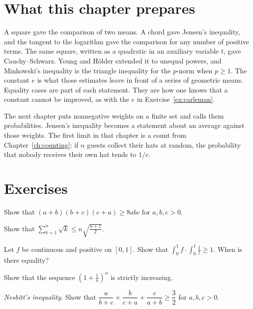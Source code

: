\section*{What this chapter prepares}

A square gave the comparison of two means. A chord gave Jensen's inequality, and the tangent to the logarithm gave the comparison for any number of positive terms. The same square, written as a quadratic in an auxiliary variable $t$, gave Cauchy--Schwarz. Young and H\"older extended it to unequal powers, and Minkowski's inequality is the triangle inequality for the $p$-norm when $p\ge1$. The constant $e$ is what those estimates leave in front of a series of geometric means. Equality cases are part of each statement. They are how one knows that a constant cannot be improved, as with the $e$ in Exercise~\ref{ex:carleman}.

The next chapter puts nonnegative weights on a finite set and calls them probabilities. Jensen's inequality becomes a statement about an average against those weights. The first limit in that chapter is a count from Chapter~\ref{ch:counting}: if $n$ guests collect their hats at random, the probability that nobody receives their own hat tends to $1/e$.

\section{Exercises}

\begin{exercise}[$\star$]\label{ex:8abc}
Show that $(a+b)(b+c)(c+a)\ge8abc$ for $a,b,c>0$.
\end{exercise}

\begin{exercise}[$\star$]\label{ex:sqrtk}
Show that $\displaystyle\sum_{k=1}^n\sqrt k\le n\sqrt{\frac{n+1}2}$.
\end{exercise}

\begin{exercise}[$\star$]\label{ex:intcs}
Let $f$ be continuous and positive on $[0,1]$. Show that $\displaystyle\int_0^1f\cdot\int_0^1\frac1f\ge1$. When is there equality?
\end{exercise}

\begin{exercise}[$\star\star$]\label{ex:euler}
Show that the sequence $\left(1+\frac1n\right)^n$ is strictly increasing.
\end{exercise}

\begin{exercise}[$\star\star$]\label{ex:nesbitt}
\emph{Nesbitt's inequality.} Show that $\dfrac a{b+c}+\dfrac b{c+a}+\dfrac c{a+b}\ge\dfrac32$ for $a,b,c>0$.
\end{exercise}

